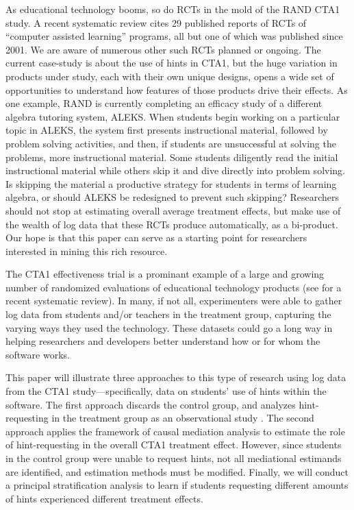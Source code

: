 \documentclass{article}
\begin{document}
As educational technology booms, so do RCTs in the mold of the RAND
CTA1 study. A recent systematic review \citep{escueta2017education} cites 29
published reports of RCTs of ``computer assisted learning'' programs,
all but one of which was published since 2001. We are aware of
numerous other such RCTs planned or ongoing. The current case-study is
about the use of hints in CTA1, but the huge variation in products
under study, each with their own unique designs, opens a wide set of opportunities to understand how features of those
products drive their effects. As one example, RAND is currently
completing an efficacy study of a different algebra tutoring system,
ALEKS. When students begin working on a particular topic in ALEKS, the
system first presents instructional material, followed by problem
solving activities, and then, if students are unsuccessful at solving
the problems, more instructional material. Some students diligently
read the initial instructional material while others skip it and dive
directly into problem solving. Is skipping the material a productive
strategy for students in terms of learning algebra, or should ALEKS be
redesigned to prevent such skipping? Researchers should not stop at
estimating overall average treatment effects, but make use of the
wealth of log data that these RCTs produce automatically, as a
bi-product. Our hope is that this paper can serve as a starting point
for researchers interested in mining this rich resource.

The CTA1 effectiveness trial is a prominant example of a large and
growing number of randomized evaluations of educational technology
products (see \citealt{escueta2017education} for a recent systematic review).
In many, if not all, experimenters were able to
gather log data from students and/or teachers in the treatment group,
capturing the varying ways they used the technology.
These datasets could go a long way in helping researchers and
developers better understand how or for whom the software works.

This paper will illustrate three approaches to this type of research
using log data from the CTA1 study---specifically, data on students' use
of hints within the software.
The first approach discards the control group, and analyzes
hint-requesting in the treatment group as an observational study
\citep[c.f.][]{rosenbaum2002observational}. The
second approach applies the framework of causal mediation analysis
\citep{vanderweele2015explanation,hong2015causality,imai2011unpacking} to estimate the role of
hint-requesting in the overall CTA1 treatment effect. However, since
students in the control group were unable to request hints, not all
mediational estimands are identified, and estimation methods must be
modified.
Finally, we will conduct a principal stratification analysis
\citep{frangakis} to learn if students requesting different amounts of
hints experienced different treatment effects.
\end{document}
